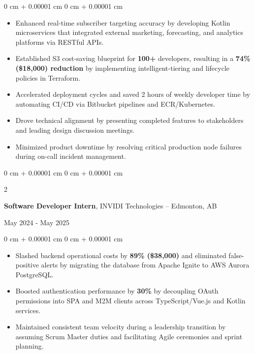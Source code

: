 \documentclass[10pt, letterpaper]{article}
\newenvironment{onecolentry}{
    \begin{adjustwidth}{
        0 cm + 0.00001 cm
    }{
        0 cm + 0.00001 cm
    }
}{
    \end{adjustwidth}
}
\newenvironment{twocolentry}[2][]{
    \onecolentry
    \def\secondColumn{#2}
    \setcolumnwidth{\fill, 6 cm}
    \begin{paracol}{2}
}{
    \switchcolumn \raggedleft \secondColumn
    \end{paracol}
    \endonecolentry
}
\begin{document}
    \vspace{0.10 cm}
    \begin{onecolentry}
        \begin{itemize}[leftmargin=2em, itemsep=1pt, parsep=0pt, topsep=0pt, partopsep=0pt]
            \item Enhanced real-time subscriber targeting accuracy by developing Kotlin microservices that integrated external marketing, forecasting, and analytics platforms via RESTful APIs.
            \item Established S3 cost-saving blueprint for \textbf{100+} developers, resulting in a \textbf{74\% (\$18,000) reduction} by implementing intelligent-tiering and lifecycle policies in Terraform.
            \item Accelerated deployment cycles and saved 2 hours of weekly developer time by automating CI/CD via Bitbucket pipelines and ECR/Kubernetes.
            \item Drove technical alignment by presenting completed features to stakeholders and leading design discussion meetings.
            \item Minimized product downtime by resolving critical production node failures during on-call incident management.
        \end{itemize}
    \end{onecolentry}

    \vspace{0.10 cm}

    \begin{twocolentry}{May 2024 - May 2025}
        \textbf{Software Developer Intern}, INVIDI Technologies -- Edmonton, AB
    \end{twocolentry}

    \vspace{0.10 cm}
    \begin{onecolentry}
        \begin{itemize}[leftmargin=2em, itemsep=1pt, parsep=0pt, topsep=0pt, partopsep=0pt]
            \item Slashed backend operational costs by \textbf{89\% (\$38,000)} and eliminated false-positive alerts by migrating the database from Apache Ignite to AWS Aurora PostgreSQL.
            \item Boosted authentication performance by \textbf{30\%} by decoupling OAuth permissions into SPA and M2M clients across TypeScript/Vue.js and Kotlin services.
            \item Maintained consistent team velocity during a leadership transition by assuming Scrum Master duties and facilitating Agile ceremonies and sprint planning.
        \end{itemize}
    \end{onecolentry}
\end{document}
